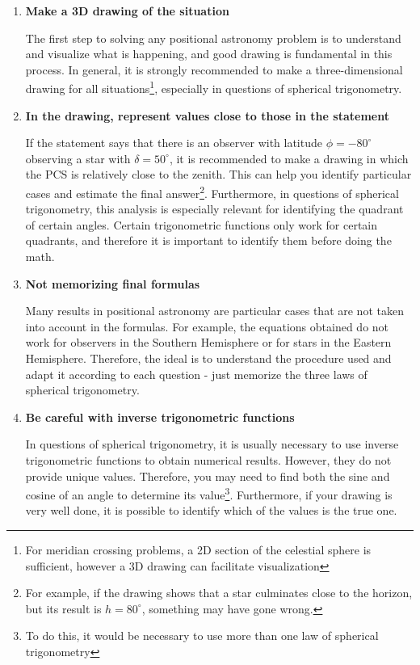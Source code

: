 \documentclass[a4paper,12pt]{extarticle}
\begin{document}
\begin{enumerate}
	\item \textbf{Make a 3D drawing of the situation}
	
	The first step to solving any positional astronomy problem is to understand and visualize what is happening, and good drawing is fundamental in this process. In general, it is strongly recommended to make a three-dimensional drawing for all situations\footnote{For meridian crossing problems, a 2D section of the celestial sphere is sufficient, however a 3D drawing can facilitate visualization}, especially in questions of spherical trigonometry.
	
	\item \textbf{In the drawing, represent values close to those in the statement}
	
	If the statement says that there is an observer with latitude $\phi = -80^\circ$ observing a star with $\delta = 50^\circ$, it is recommended to make a drawing in which the PCS is relatively close to the zenith. This can help you identify particular cases and estimate the final answer\footnote{For example, if the drawing shows that a star culminates close to the horizon, but its result is $h = 80^\circ$, something may have gone wrong.}. Furthermore, in questions of spherical trigonometry, this analysis is especially relevant for identifying the quadrant of certain angles. Certain trigonometric functions only work for certain quadrants, and therefore it is important to identify them before doing the math.
	
	\item \textbf{Not memorizing final formulas}
	
	Many results in positional astronomy are particular cases that are not taken into account in the formulas. For example, the equations obtained do not work for observers in the Southern Hemisphere or for stars in the Eastern Hemisphere. Therefore, the ideal is to understand the procedure used and adapt it according to each question - just memorize the three laws of spherical trigonometry.
	
	\item \textbf{Be careful with inverse trigonometric functions}
	
	In questions of spherical trigonometry, it is usually necessary to use inverse trigonometric functions to obtain numerical results. However, they do not provide unique values. Therefore, you may need to find both the sine and cosine of an angle to determine its value\footnote{To do this, it would be necessary to use more than one law of spherical trigonometry}. Furthermore, if your drawing is very well done, it is possible to identify which of the values is the true one.
\end{enumerate}
\end{document}
